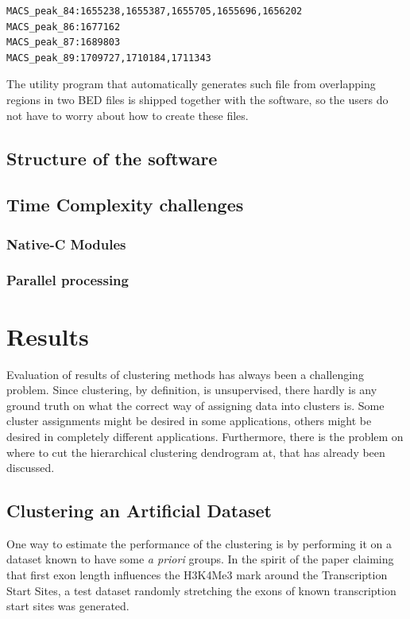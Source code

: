 \documentclass[parskip]{cs4rep}
\begin{document}
\begin{verbatim}
MACS_peak_84:1655238,1655387,1655705,1655696,1656202
MACS_peak_86:1677162
MACS_peak_87:1689803
MACS_peak_89:1709727,1710184,1711343
\end{verbatim}

The utility program that automatically generates such file from overlapping regions in two BED files is shipped together with the software, so the users do not have to worry about how to create these files.

\section{Structure of the software}

\section{Time Complexity challenges}
\subsection{Native-C Modules}
\subsection{Parallel processing}

\chapter{Results}
Evaluation of results of clustering methods has always been a challenging problem. Since clustering, by definition, is unsupervised, there hardly is any ground truth on what the correct way of assigning data into clusters is. Some cluster assignments might be desired in some applications, others might be desired in completely different applications. Furthermore, there is the problem on where to cut the hierarchical clustering dendrogram at, that has already been discussed.

\section{Clustering an Artificial Dataset}
One way to estimate the performance of the clustering is by performing it on a dataset known to have some \emph{a priori} groups. In the spirit of the paper claiming that first exon length influences the H3K4Me3 mark around the Transcription Start Sites\cite{Bieberstein:2012tf}, a test dataset randomly stretching the exons of known transcription start sites was generated.
\end{document}
